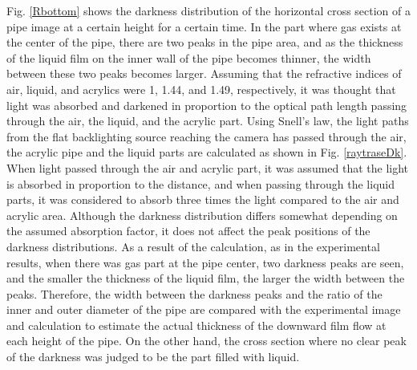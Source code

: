 \documentclass[aps,pre,preprint,groupedaddress,showkeys]{revtex4-2}
\begin{document}
Fig. \ref{Rbottom} shows the darkness distribution of the horizontal cross section of a pipe image at a certain height for a certain time.
In the part where gas exists at the center of the pipe, there are two peaks in the pipe area, and as the thickness of the liquid film on the inner wall of the pipe becomes thinner, the width between these two peaks becomes larger.
Assuming that the refractive indices of air, liquid, and acrylics were 1, 1.44, and 1.49, respectively, it was thought that light was absorbed and darkened in proportion to the optical path length passing through the air, the liquid, and the acrylic part.
Using Snell's law, the light paths from the flat backlighting source reaching the camera has passed through the air, the acrylic pipe and the liquid parts are calculated as shown in Fig. \ref{raytraseDk}.
When light passed through the air and acrylic part, it was assumed that the light is absorbed in proportion to the distance, and when passing through the liquid parts, it was considered to absorb three times the light compared to the air and acrylic area.
Although the darkness distribution differs somewhat depending on the assumed absorption factor, it does not affect the peak positions of the darkness distributions.
As a result of the calculation, as in the experimental results, when there was gas part at the pipe center, two darkness peaks are seen, and the smaller the thickness of the liquid film, the larger the width between the peaks.
Therefore, the width between the darkness peaks and the ratio of the inner and outer diameter of the pipe are compared with the experimental image and calculation to estimate the actual thickness of the downward film flow at each height of the pipe.
On the other hand, the cross section where no clear peak of the darkness was judged to be the part filled with liquid.
\end{document}
